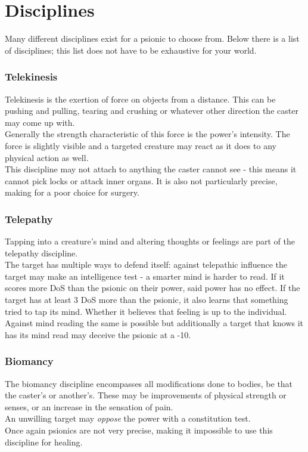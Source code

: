 \documentclass[12pt,a4paper,openany]{book}
\begin{document}
	\section{Disciplines}
	Many different disciplines exist for a psionic to choose from. Below there is a list of disciplines; this list does not have to be exhaustive for your world.
	\subsubsection*{Telekinesis}
	Telekinesis is the exertion of force on objects from a distance. This can be pushing and pulling, tearing and crushing or whatever other direction the caster may come up with.\\
	Generally the strength characteristic of this force is the power's intensity. The force is slightly visible and a targeted creature may react as it does to any physical action as well.\\
	This discipline may not attach to anything the caster cannot see - this means it cannot pick locks or attack inner organs. It is also not particularly precise, making for a poor choice for surgery.
	\subsubsection*{Telepathy}
	Tapping into a creature's mind and altering thoughts or feelings are part of the telepathy discipline.\\
	The target has multiple ways to defend itself: against telepathic influence the target may make an intelligence test - a smarter mind is harder to read.
	If it scores more DoS than the psionic on their power, said power has no effect. If the target has at least 3 DoS more than the psionic, it also learns that something tried to tap its mind. Whether it believes that feeling is up to the individual.\\
	Against mind reading the same is possible but additionally a target that knows it has its mind read may deceive the psionic at a -10.
	\subsubsection*{Biomancy}
	The biomancy discipline encompasses all modifications done to bodies, be that the caster's or another's. These may be improvements of physical strength or senses, or an increase in the sensation of pain.\\
	An unwilling target may \emph{oppose} the power with a constitution test.\\
	Once again psionics are not very precise, making it impossible to use this discipline for healing.
\end{document}
